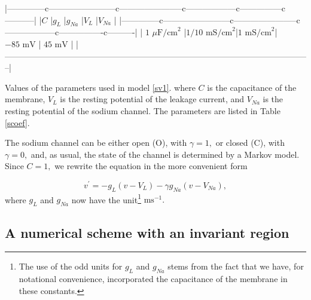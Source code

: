|--------------c------------------------c-----------------------c------------------c---------------c-----------|
|$C$                       |$g_L$                   |$g_{Na}$            |$V_L$           |$V_{Na}$            |
|--------------c------------------------c-----------------------c------------------c----------------c----------|
| $1$ $\mu\text{F/cm}^{2}$ |$1/10 \text{ mS/cm}^{2}$|$1\text{ mS/cm}^{2}$|$-85\text{ mV}$ | $45\text{ mV}$     |
|--------------------------------------------------------------------------------------------------------------|

Values of the parameters used in model \ref{sv1}.%
where $C$ is the capacitance of the membrane, $V_{L}$ is the resting potential
of the leakage current, and $V_{Na}$ is the resting potential of the sodium
channel. The parameters are listed in Table \ref{scoef}.


The sodium channel can be either open (O), with $\gamma=1,$ or closed (C), with
$\gamma=0,$ and, as usual, the state of the channel is determined by a Markov
model. Since $C=1,$ we rewrite the equation in the more convenient form

\begin{equation}
v^{\prime}=-g_{L}\left(  v-V_{L}\right)  -\gamma g_{Na}(v-V_{Na}), \label{sv2}
\end{equation}
where $g_{L}$ and $g_{Na}$ now have the unit\footnote{The use of the odd units for 
$g_{L}$ and $g_{Na}$ stems from the fact that we have, for notational
 convenience, incorporated the capacitance of the membrane in these constants.}
$\text{ms}^{-1}.$

\subsection{A numerical scheme with an invariant region}

